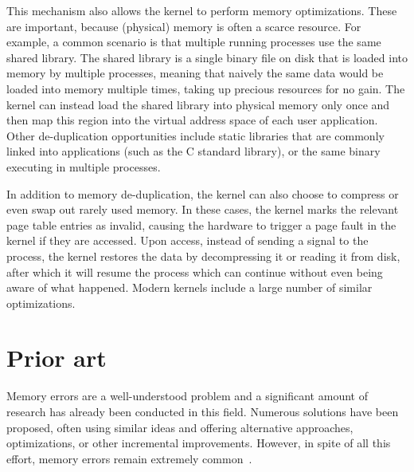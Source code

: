 This mechanism also allows the kernel to perform memory optimizations. These are important, because (physical) memory is often a scarce resource. For example, a common scenario is that multiple running processes use the same shared library. The shared library is a single binary file on disk that is loaded into memory by multiple processes, meaning that naively the same data would be loaded into memory multiple times, taking up precious resources for no gain. The kernel can instead load the shared library into physical memory only once and then map this region into the virtual address space of each user application. Other de-duplication opportunities include static libraries that are commonly linked into applications (such as the C standard library), or the same binary executing in multiple processes.

In addition to memory de-duplication, the kernel can also choose to compress or even swap out rarely used memory. In these cases, the kernel marks the relevant page table entries as invalid, causing the hardware to trigger a page fault in the kernel if they are accessed. Upon access, instead of sending a signal to the process, the kernel restores the data by decompressing it or reading it from disk, after which it will resume the process which can continue without even being aware of what happened. Modern kernels include a large number of similar optimizations. 


\section{Prior art}

Memory errors are a well-understood problem and a significant amount of research has already been conducted in this field. Numerous solutions have been proposed, often using similar ideas and offering alternative approaches, optimizations, or other incremental improvements. However, in spite of all this effort, memory errors remain extremely common~\cite{memerrors-past-present-future}.


